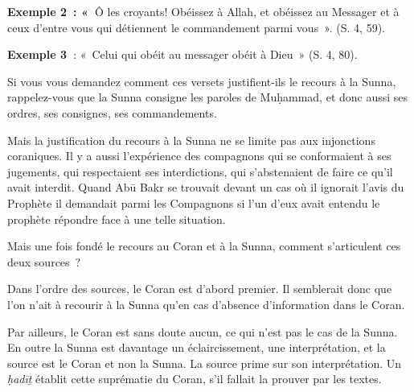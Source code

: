 
\textbf{Exemple 2~: «~}Ô les croyants! Obéissez à Allah, et obéissez au
Messager et à ceux d'entre vous qui détiennent le commandement parmi
vous~». (S. 4, 59).


\textbf{Exemple 3~}: «~Celui qui obéit au messager obéit à Dieu~» (S. 4,
80).


Si vous vous demandez comment ces versets justifient-ils le recours à la
Sunna, rappelez-vous que la Sunna consigne les paroles de Muḥammad, et
donc aussi ses ordres, ses consignes, ses commandements.

Mais la justification du recours à la Sunna ne se limite pas aux
injonctions coraniques. Il y a aussi l'expérience des compagnons qui se
conformaient à ses jugements, qui respectaient ses interdictions, qui
s'abstenaient de faire ce qu'il avait interdit. Quand Abū Bakr se
trouvait devant un cas où il ignorait l'avis du Prophète il demandait
parmi les Compagnons si l'un d'eux avait entendu le prophète répondre
face à une telle situation.

Mais une fois fondé le recours au Coran et à la Sunna, comment
s'articulent ces deux sources~?



Dans l'ordre des sources, le Coran est d'abord premier. Il semblerait
donc que l'on n'ait à recourir à la Sunna qu'en cas d'absence
d'information dans le Coran.

Par ailleurs, le Coran est sans doute aucun, ce qui n'est pas le cas de
la Sunna. En outre la Sunna est davantage un éclaircissement, une
interprétation, et la source est le Coran et non la Sunna. La source
prime sur son interprétation. Un \emph{ḥadīṯ} établit cette suprématie
du Coran, s'il fallait la prouver par les textes.

